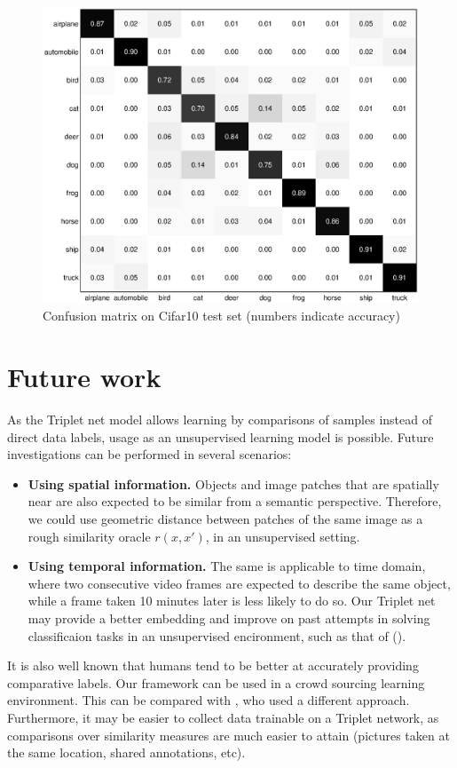 \documentclass{article} %
\begin{document}
\begin{figure}[h]
\begin{center}
\includegraphics[width=0.8\linewidth]{confusion.eps}
\end{center}
   \caption{Confusion matrix on Cifar10 test set (numbers indicate accuracy)}\label{confusion}
\end{figure}
\section{Future work}
As the Triplet net model allows learning by comparisons of samples instead of direct data labels, usage as an unsupervised learning model is possible.
Future investigations can be performed in several scenarios:
\begin{itemize}
 \item {\bf Using spatial information. }Objects and image patches that are spatially near are also expected to be similar from a semantic perspective. Therefore, we could use geometric distance between patches of the same image as a rough similarity oracle $r(x,x')$, in an unsupervised setting.  
\item {\bf Using temporal information.} The same is applicable to time domain, where two consecutive video frames are expected to describe the same object, while a frame taken 10 minutes later is less likely to do so.
Our Triplet net may provide a better embedding and improve on past attempts in solving classificaion
tasks in an unsupervised encironment, such as that of (\citet{mobahi2009deep}).
\end{itemize}
It is also well known that humans tend to be better at accurately providing comparative labels. Our framework can be used in a crowd sourcing learning environment. This can be compared with \citet{shamir}, who used a different approach.
Furthermore, it may be easier to collect data trainable on a Triplet network, as comparisons over similarity measures are much easier to attain (pictures taken at the same location, shared annotations, etc).
\end{document}

